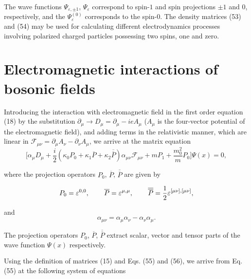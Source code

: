 \documentclass[a4paper,12pt]{article}
\begin{document}
The wave functions $\Psi _{\varepsilon ,\pm 1}$, $\Psi
_\varepsilon $ correspond to spin-$1$ and spin projections $\pm 1$
and $0$, respectively, and the $\Psi _\varepsilon ^{(0)}$
corresponds to the spin-$0$. The density matrices (53) and (54)
may be used for calculating different electrodynamics processes
involving polarized charged particles possessing two spins, one
and zero.

\section{Electromagnetic interactions of bosonic fields}

Introducing the interaction with electromagnetic field in the
first order equation (18) by the substitution $\partial _\mu
\rightarrow D_\mu =\partial _\mu -ieA_\mu $ ($A_\mu $ is the
four-vector potential of the electromagnetic field), and adding
terms in the relativistic manner, which are linear in
$\mathcal{F}_{\mu \nu }=\partial _\mu A_\nu -\partial _\nu A_\mu
$, we arrive at the matrix equation
\begin{equation}
\biggl [\alpha _\mu D_\mu +\frac i2\left( \kappa _0P_0+\kappa
_1\overline{P} +\kappa _2\overline{\overline{P}}\right) \alpha
_{\mu \nu }\mathcal{F}_{\mu \nu }+m P_1+\frac{m^2_0}{m} P_0\biggr
]\Psi (x)=0,  \label{55}
\end{equation}

where the projection operators $P_0$, $\overline{P}$,
$\overline{\overline{P} }$ are given by

\begin{equation}
P_0=\varepsilon ^{0,0},\hspace{0.3in}\overline{P}=\varepsilon
^{\mu ,\mu }, \hspace{0.3in}\overline{\overline{P}}=\frac
12\varepsilon ^{[\mu \nu ],[\mu \nu ]},  \label{56}
\end{equation}

and
\begin{equation}
\alpha _{\mu \nu }=\alpha _\mu \alpha _\nu -\alpha _\nu \alpha
_\mu. \label{57}
\end{equation}

The projection operators $P_0$, $\overline{P}$,
$\overline{\overline{P}}$ extract scalar, vector and tensor parts
of the wave function $\Psi (x)$ respectively.

Using the definition of matrices (15) and Eqs. (55) and (56), we
arrive from Eq. (55) at the following system of equations
\end{document}
